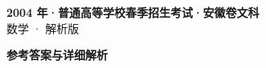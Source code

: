 \documentclass[zihao=-4, a4paper]{ctexart}
\begin{document}
\begin{center}
  {\Large\bfseries 2004 年·普通高等学校春季招生考试·安徽卷文科}\\[4pt]
  {\large 数学 · 解析版}
\end{center}
\medskip
{}

\clearpage
{}
\begin{center}{\Large\bfseries 参考答案与详细解析}\end{center}
\medskip

\end{document}
